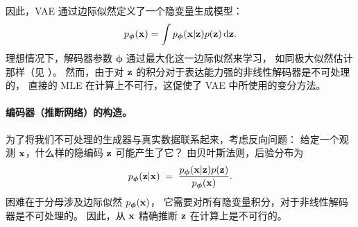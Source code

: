 因此，VAE 通过边际似然定义了一个隐变量生成模型：
\[
p_{\bm{\phi}}({\mathbf{x}}) = \int p_{\bm{\phi}}({\mathbf{x}}|{\mathbf{z}}) p({\mathbf{z}}) \mathop{}\!\mathrm{d} {\mathbf{z}}.
\]
理想情况下，解码器参数 $\bm{\phi}$ 通过最大化这一边际似然来学习，
如同极大似然估计那样（见 ）。
然而，由于对 ${\mathbf{z}}$ 的积分对于表达能力强的非线性解码器是不可处理的，
直接的 MLE 在计算上不可行，这促使了 VAE 中所使用的变分方法。




\paragraph{编码器（推断网络）的构造。}



为了将我们不可处理的生成器与真实数据联系起来，考虑反向问题：
给定一个观测 ${\mathbf{x}}$，什么样的隐编码 ${\mathbf{z}}$ 可能产生了它？
由贝叶斯法则，后验分布为
\[
p_{\bm{\phi}}({\mathbf{z}}|{\mathbf{x}}) \;=\; \frac{p_{\bm{\phi}}({\mathbf{x}}|{\mathbf{z}}) p({\mathbf{z}})}{p_{\bm{\phi}}({\mathbf{x}})}.
\]
困难在于分母涉及边际似然 $p_{\bm{\phi}}({\mathbf{x}})$，
它需要对所有隐变量积分，对于非线性解码器是不可处理的。
因此，从 ${\mathbf{x}}$ 精确推断 ${\mathbf{z}}$ 在计算上是不可行的。

